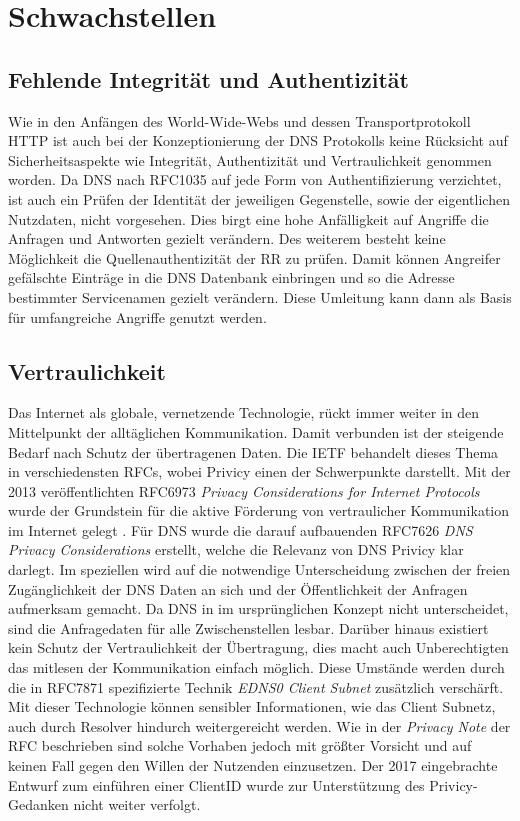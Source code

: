 \chapter{Schwachstellen}
\label{chap:threads}

\section{Fehlende Integrität und Authentizität}
\label{sec:Thread-Auth}

Wie in den Anfängen des World-Wide-Webs und dessen Transportprotokoll HTTP ist auch bei der Konzeptionierung der DNS Protokolls keine Rücksicht auf Sicherheitsaspekte wie Integrität, Authentizität und Vertraulichkeit genommen worden. Da DNS nach RFC1035\cite{rfc1035} auf jede Form von Authentifizierung verzichtet, ist auch ein Prüfen der Identität der jeweiligen Gegenstelle, sowie der eigentlichen Nutzdaten, nicht vorgesehen. Dies birgt eine hohe Anfälligkeit auf Angriffe die Anfragen und Antworten gezielt verändern. Des weiterem besteht keine Möglichkeit die Quellenauthentizität der RR zu prüfen. Damit können Angreifer gefälschte Einträge in die DNS Datenbank einbringen und so die Adresse bestimmter Servicenamen gezielt verändern. Diese Umleitung kann dann als Basis für umfangreiche Angriffe genutzt werden.

\section{Vertraulichkeit}
\label{sec:Thread-Priv}

Das Internet als globale, vernetzende Technologie, rückt immer weiter in den Mittelpunkt der alltäglichen Kommunikation. Damit verbunden ist der steigende Bedarf nach Schutz der übertragenen Daten. Die IETF behandelt dieses Thema in verschiedensten RFCs, wobei Privicy einen der Schwerpunkte darstellt. Mit der 2013 veröffentlichten RFC6973 \textit{Privacy Considerations for Internet Protocols}\cite{rfc6973} wurde der Grundstein für die aktive Förderung von vertraulicher Kommunikation im Internet gelegt . 
Für DNS wurde die darauf aufbauenden RFC7626 \textit{DNS Privacy Considerations}\cite{rfc7626} erstellt, welche die Relevanz von DNS Privicy klar darlegt. Im speziellen wird auf die notwendige Unterscheidung zwischen der freien Zugänglichkeit der DNS Daten an sich und der Öffentlichkeit der Anfragen aufmerksam gemacht. Da DNS in im ursprünglichen Konzept nicht unterscheidet, sind die Anfragedaten für alle Zwischenstellen lesbar. Darüber hinaus existiert kein Schutz der Vertraulichkeit der Übertragung, dies macht auch Unberechtigten das mitlesen der Kommunikation einfach möglich. 
Diese Umstände werden durch die in RFC7871\cite{RFC7871} spezifizierte Technik \textit{EDNS0 Client Subnet} zusätzlich verschärft. Mit dieser Technologie können sensibler Informationen, wie das Client Subnetz, auch durch Resolver hindurch weitergereicht werden. Wie in der \textit{Privacy Note} der RFC beschrieben sind solche Vorhaben jedoch mit größter Vorsicht und auf keinen Fall gegen den Willen der Nutzenden einzusetzen. Der 2017 eingebrachte Entwurf zum einführen einer ClientID\cite{Licht2017} wurde zur Unterstützung des Privicy-Gedanken nicht weiter verfolgt.

